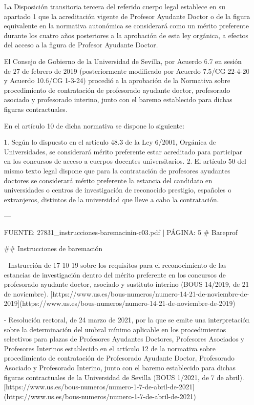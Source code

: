 \documentclass{article}
\begin{document}
\begin{itemize}
\begin{itemize}
\begin{scriptsize}
                  La Disposición transitoria tercera del referido cuerpo legal establece en su apartado 1 que la acreditación vigente de Profesor Ayudante Doctor o de la figura equivalente en la normativa autonómica se considerará como un mérito preferente durante los cuatro años posteriores a la aprobación de esta ley orgánica, a efectos del acceso a la figura de Profesor Ayudante Doctor.

                  El Consejo de Gobierno de la Universidad de Sevilla, por Acuerdo 6.7 en sesión de 27 de febrero de 2019 (posteriormente modificado por Acuerdo 7.5/CG 22-4-20 y Acuerdo 10.6/CG 1-3-24) procedió a la aprobación de la Normativa sobre procedimiento de contratación de profesorado ayudante doctor, profesorado asociado y profesorado interino, junto con el baremo establecido para dichas figuras contractuales.

                  En el artículo 10 de dicha normativa se dispone lo siguiente:

                  1. Según lo dispuesto en el artículo 48.3 de la Ley 6/2001, Orgánica de Universidades, se considerará mérito preferente estar acreditado para participar en los concursos de acceso a cuerpos docentes universitarios.
                  2. El artículo 50 del mismo texto legal dispone que para la contratación de profesores ayudantes doctores se considerará mérito preferente la estancia del candidato en universidades o centros de investigación de reconocido prestigio, españoles o extranjeros, distintos de la universidad que lleve a cabo la contratación.

                  ---

                  FUENTE: 27831\_instrucciones-baremacinin-r03.pdf | PÁGINA: 5
                  \# Bareprof

                  \#\# Instrucciones de baremación

                  - Instrucción de 17-10-19 sobre los requisitos para el reconocimiento de las estancias de investigación dentro del mérito preferente en los concursos de profesorado ayudante doctor, asociado y sustituto interino (BOUS 14/2019, de 21 de noviembre).
                    [https://www.us.es/bous-numeros/numero-14-21-de-noviembre-de-2019](https://www.us.es/bous-numeros/numero-14-21-de-noviembre-de-2019)

                  - Resolución rectoral, de 24 marzo de 2021, por la que se emite una interpretación sobre la determinación del umbral mínimo aplicable en los procedimientos selectivos para plazas de Profesores Ayudantes Doctores, Profesores Asociados y Profesores Interinos establecido en el artículo 12 de la normativa sobre procedimiento de contratación de Profesorado Ayudante Doctor, Profesorado Asociado y Profesorado Interino, junto con el baremo establecido para dichas figuras contractuales de la Universidad de Sevilla (BOUS 1/2021, de 7 de abril).
                    [https://www.us.es/bous-numeros/numero-1-7-de-abril-de-2021](https://www.us.es/bous-numeros/numero-1-7-de-abril-de-2021)


\end{scriptsize}
\end{itemize}
\end{itemize}
\end{document}
